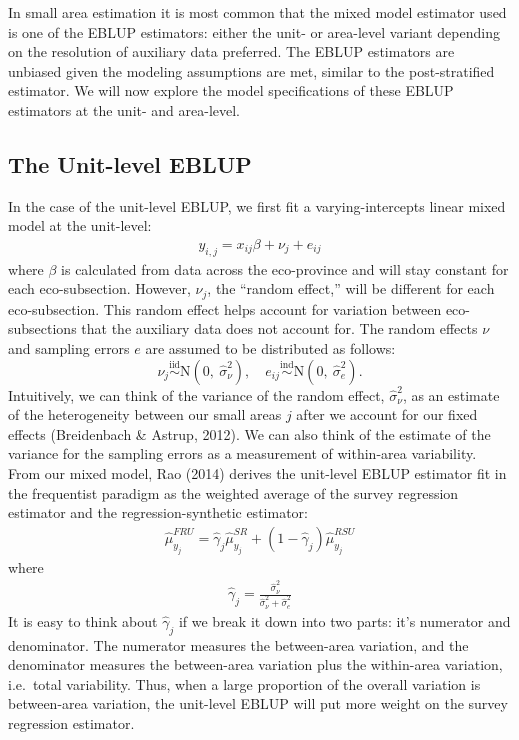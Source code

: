 \documentclass[12pt,twoside]{reedthesis}
\begin{document}
In small area estimation it is most common that the mixed model estimator used is one of the EBLUP estimators: either the unit- or area-level variant depending on the resolution of auxiliary data preferred. The EBLUP estimators are unbiased given the modeling assumptions are met, similar to the post-stratified estimator. We will now explore the model specifications of these EBLUP estimators at the unit- and area-level.

\hypertarget{the-unit-level-eblup}{%
\subsection{The Unit-level EBLUP}\label{the-unit-level-eblup}}

In the case of the unit-level EBLUP, we first fit a varying-intercepts linear mixed model at the unit-level:
\begin{align}
y_{i,j} = x_{ij} \beta + \nu_j + e_{ij} \label{eq:unit-mod}
\end{align}
where \(\beta\) is calculated from data across the eco-province and will stay constant for each eco-subsection. However, \(\nu_j\), the ``random effect,'' will be different for each eco-subsection. This random effect helps account for variation between eco-subsections that the auxiliary data does not account for. The random effects \(\nu\) and sampling errors \(e\) are assumed to be distributed as follows:
\[
 \newcommand\myeq{\stackrel{\mathclap{\normalfont\mbox{s}}}{~}}
\nu_j \stackrel{\text{iid}}{\sim} \text{N}(0,~ \hat\sigma^2_{\nu}), \quad
e_{ij} \stackrel{\text{ind}}{\sim}\text{N}(0,~\hat\sigma^2_e).
\]
Intuitively, we can think of the variance of the random effect, \(\hat\sigma^2_\nu\), as an estimate of the heterogeneity between our small areas \(j\) after we account for our fixed effects (Breidenbach \& Astrup, 2012). We can also think of the estimate of the variance for the sampling errors as a measurement of within-area variability. From our mixed model, Rao (2014) derives the unit-level EBLUP estimator fit in the frequentist paradigm as the weighted average of the survey regression estimator and the regression-synthetic estimator:
\begin{align}
\hat \mu_{y_j}^{FRU} = \hat \gamma_j \hat\mu_{y_j}^{SR} + (1 - \hat \gamma_j) \hat\mu_{y_j}^{RSU}
\end{align}
where
\begin{align}
\hat\gamma_j = \frac{\hat\sigma^2_\nu}{\hat\sigma^2_\nu + \hat\sigma^2_e}
\end{align}
It is easy to think about \(\hat\gamma_j\) if we break it down into two parts: it's numerator and denominator. The numerator measures the between-area variation, and the denominator measures the between-area variation plus the within-area variation, i.e.~total variability. Thus, when a large proportion of the overall variation is between-area variation, the unit-level EBLUP will put more weight on the survey regression estimator.
\end{document}
